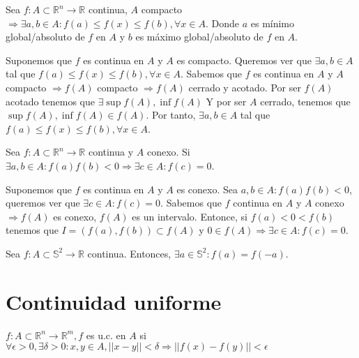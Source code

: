 \begin{theo}[de Weierstrass]
Sea $f:A\subset \mathbb{R}^n \rightarrow \mathbb{R}$ continua, $A$ compacto $\Rightarrow \exists a,b \in A: f(a)\leq f(x)\leq f(b), \forall x \in A$. Donde $a$ es mínimo global/absoluto de $f$ en $A$ y $b$ es máximo global/absoluto de $f$ en $A$.\\
\end{theo}

\begin{dem}
Suponemos que $f$ es continua en $A$ y $A$ es compacto. Queremos ver que $\exists a,b \in A$ tal que $f(a)\leq f(x)\leq f(b), \forall x \in A$. Sabemos que $f$ es continua en $A$ y $A$ compacto $\Rightarrow f(A)$ compacto $\Rightarrow f(A)$ cerrado y acotado. Por ser $f(A)$ acotado tenemos que $\exists \sup f(A), \inf f(A)$ Y por ser $A$ cerrado, tenemos que $ \sup f(A), \inf f(A)\in f(A)$. Por tanto, $\exists a,b \in A$ tal que $f(a)\leq f(x)\leq f(b), \forall x \in A$.
\end{dem}

\begin{theo}[de Bolzano]
Sea $f:A\subset \mathbb{R}^n \rightarrow \mathbb{R}$ continua y $A$ conexo. Si $\exists a,b \in A: f(a)f(b)<0 \Rightarrow \exists c \in A: f(c) = 0$.\\
\end{theo}

\begin{dem}
Suponemos que $f$ es continua en $A$ y $A$ es conexo. Sea $a,b \in A: f(a)f(b)<0 $, queremos ver que $\exists c \in A: f(c) = 0$. Sabemos que $f$  continua en $A$ y $A$  conexo $\Rightarrow f(A)$ es conexo, $f(A)$ es un intervalo. Entonce, si $f(a) < 0 < f(b)$ tenemos que $I=(f(a), f(b))\subset f(A)$ y $ 0 \in f(A) \Rightarrow \exists c \in A: f(c) = 0$.
\end{dem}

\begin{theo}[de Borsuk]
Sea $f:A\subset \mathbb{S}^2 \rightarrow \mathbb{R}$ continua. Entonces, $\exists a\in \mathbb{S}^2: f(a) = f(-a)$.
\end{theo}

\section{Continuidad uniforme}

\begin{defn}
$f:A\subset \mathbb{R}^n \rightarrow \mathbb{R}^m, f$ es u.c. en $A$ si $\forall \epsilon > 0, \exists \delta > 0: x,y\in A, ||x-y||<\delta \Rightarrow ||f(x) - f(y)|| < \epsilon$
\end{defn}

